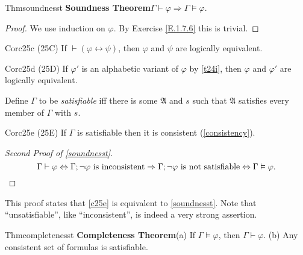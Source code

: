 \begin{reference}{Thm}{soundnesst}
  \textbf{Soundness Theorem}\quad $\Gamma\vdash \varphi\Rightarrow \Gamma\vDash \varphi.$
\end{reference}

\begin{proof}
  We use induction on $\varphi$. By Exercise \ref{E.1.7.6} this is trivial.
\end{proof}

\begin{reference}{Cor}{c25c}
  (25C) If $\vdash(\varphi \leftrightarrow \psi)$, then $\varphi$ and $\psi$ are logically equivalent.
\end{reference}

\begin{reference}{Cor}{c25d}
  (25D) If $\varphi'$ is an alphabetic variant of $\varphi$ by \ref{t24i}, then $\varphi$ and $\varphi'$ are logically equivalent.
\end{reference}

Define $\Gamma$ to be \textit{satisfiable} iff there is some $\mathfrak{A}$ and $s$ such that $\mathfrak{A}$ satisfies every member of $\Gamma$ with $s$.

\begin{reference}{Cor}{c25e}
  (25E) If $\Gamma$ is satisfiable then it is consistent (\ref{consistency}).
\end{reference}

\begin{proof}[Second Proof of \ref{soundnesst}]
  \[
    \Gamma\vdash \varphi\Leftrightarrow \Gamma;\neg \varphi\text{ is inconsistent}\Rightarrow \Gamma;\neg \varphi\text{ is not satisfiable}\Leftrightarrow \Gamma\vDash \varphi.\qedhere
  \]
\end{proof}
This proof states that \ref{c25e} is equivalent to \ref{soundnesst}. Note that ``unsatisfiable'', like ``inconsistent'', is indeed a very strong assertion.

\begin{reference}{Thm}{completenesst}
  \textbf{Completeness Theorem}\quad(a) If $\Gamma\vDash \varphi$, then $\Gamma\vdash \varphi$. (b) Any consistent set of formulas is satisfiable.\qedhere
\end{reference}

